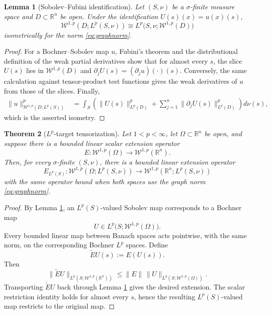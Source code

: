 \documentclass[11pt]{article}
\newtheorem{theorem}{Theorem}[section]
\newtheorem{lemma}[theorem]{Lemma}
\theoremstyle{remark}
\newcommand{\R}{\mathbb{R}}
\newcommand{\Om}{\Omega}
\newcommand{\Wgraph}{\mathcal{W}^{1,p}}
\begin{document}
\begin{lemma}[Sobolev--Fubini identification]
\label{lem:fubini}
Let $(S,\nu)$ be a $\sigma$-finite measure space and $D\subset\R^n$ be open.
Under the identification $U(s)(x)=u(x)(s)$,
\[
  \Wgraph(D;L^p(S,\nu))
  \cong L^p\bigl(S,\nu;\Wgraph(D)\bigr)
\]
isometrically for the norm \eqref{eq:graphnorm}.
\end{lemma}

\begin{proof}
For a Bochner--Sobolev map $u$, Fubini's theorem and the distributional
definition of the weak partial derivatives show that for almost every
$s$, the slice $U(s)$ lies in $\Wgraph(D)$ and
$\partial_j U(s)=(\partial_j u)(\cdot)(s)$.  Conversely, the same
calculation against tensor-product test functions gives the weak derivatives
of $u$ from those of the slices.  Finally,
\[
 \begin{split}
  \|u\|_{\Wgraph(D;L^p(S))}^p
  &=\int_S\left(
       \|U(s)\|_{L^p(D)}^p+
       \sum_{j=1}^n\|\partial_jU(s)\|_{L^p(D)}^p
     \right)d\nu(s),
 \end{split}
\]
which is the asserted isometry.
\end{proof}

\begin{theorem}[$L^p$-target tensorization]
\label{thm:Lptarget}
Let $1<p<\infty$, let $\Om\subset\R^n$ be open, and suppose there is a
bounded linear scalar extension operator
\[
  E:\Wgraph(\Om)\longrightarrow \Wgraph(\R^n).
\]
Then, for every $\sigma$-finite $(S,\nu)$, there is a bounded linear extension
operator
\[
  E_{L^p(S)}:\Wgraph(\Om;L^p(S,\nu))
  \longrightarrow \Wgraph(\R^n;L^p(S,\nu))
\]
with the same operator bound when both spaces use the graph norm
\eqref{eq:graphnorm}.
\end{theorem}

\begin{proof}
By Lemma \ref{lem:fubini}, an $L^p(S)$-valued Sobolev map corresponds to a
Bochner map
\[
  U\in L^p\bigl(S;\Wgraph(\Om)\bigr).
\]
Every bounded linear map between Banach spaces acts pointwise, with the same
norm, on the corresponding Bochner $L^p$ spaces.  Define
\[
  \widetilde E U(s):=E(U(s)).
\]
Then
\[
  \|\widetilde E U\|_{L^p(S;\Wgraph(\R^n))}
  \le \|E\|\,
      \|U\|_{L^p(S;\Wgraph(\Om))}.
\]
Transporting $\widetilde E U$ back through Lemma \ref{lem:fubini} gives the
desired extension.  The scalar restriction identity holds for almost every
$s$, hence the resulting $L^p(S)$-valued map restricts to the original map.
\end{proof}
\end{document}
